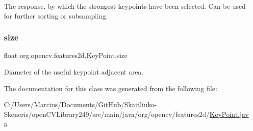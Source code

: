 The response, by which the strongest keypoints have been selected. Can be used for further sorting or subsampling. \mbox{\label{classorg_1_1opencv_1_1features2d_1_1_key_point_aff65ea537ec0b3510fc0eb1472588c68}} 
\subsubsection{\texorpdfstring{size}{size}}
{\footnotesize\ttfamily float org.\+opencv.\+features2d.\+Key\+Point.\+size}

Diameter of the useful keypoint adjacent area. 

The documentation for this class was generated from the following file\+:\begin{DoxyCompactItemize}
\item 
C\+:/\+Users/\+Marcius/\+Documents/\+Git\+Hub/\+Skaitliuko-\/\+Skeneris/open\+C\+V\+Library249/src/main/java/org/opencv/features2d/\mbox{\hyperlink{_key_point_8java}{Key\+Point.\+java}}\end{DoxyCompactItemize}

